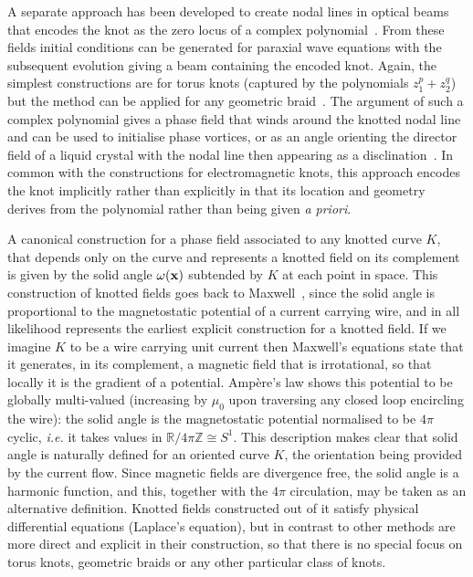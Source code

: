     A separate approach has been developed to create nodal lines in optical beams that encodes the knot as the zero locus of a complex polynomial~\citep{Dennis2010}. From these fields initial conditions can be generated for paraxial wave equations with the subsequent evolution giving a beam containing the encoded knot. Again, the simplest constructions are for torus knots (captured by the polynomials $z_1^p+z_2^q$) but the method can be applied for any geometric braid~\citep{Bode2017,Dennis2017}. The argument of such a complex polynomial gives a phase field that winds around the knotted nodal line and can be used to initialise phase vortices, or as an angle orienting the director field of a liquid crystal with the nodal line then appearing as a disclination~\citep{Machon2014}. In common with the constructions for electromagnetic knots, this approach encodes the knot implicitly rather than explicitly in that its location and geometry derives from the polynomial rather than being given {\sl a priori}. 

    A canonical construction for a phase field associated to any knotted curve $K$, that depends only on the curve and represents a knotted field on its complement is given by the solid angle $\omega(\bf{x})$ subtended by $K$ at each point in space. This construction of knotted fields goes back to Maxwell~\citep{Maxwell2}, since the solid angle is proportional to the magnetostatic potential of a current carrying wire, and in all likelihood represents the earliest explicit construction for a knotted field. 
    If we imagine $K$ to be a wire carrying unit current then Maxwell's equations state that it generates, in its complement, a magnetic field that is irrotational, so that locally it is the gradient of a potential. Amp\`ere's law shows this potential to be globally multi-valued (increasing by $\mu_0$ upon traversing any closed loop encircling the wire): the solid angle is the magnetostatic potential normalised to be $4\pi$ cyclic, {\sl i.e.} it takes values in $\mathbb{R}/4\pi\mathbb{Z}\cong S^1$. This description makes clear that solid angle is naturally defined for an oriented curve $K$, the orientation being provided by the current flow. Since magnetic fields are divergence free, the solid angle is a harmonic function, and this, together with the $4\pi$ circulation, may be taken as an alternative definition. Knotted fields constructed out of it satisfy physical differential equations (Laplace's equation), but in contrast to other methods are more direct and explicit in their construction, so that there is no special focus on torus knots, geometric braids or any other particular class of knots. 

